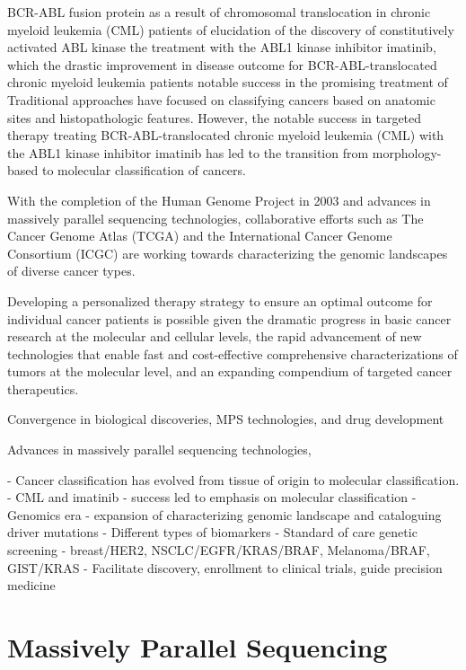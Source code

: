 BCR-ABL fusion protein as a result of chromosomal translocation in chronic myeloid leukemia (CML) patients
of elucidation of the discovery of constitutively activated ABL kinase  the treatment with the ABL1 kinase inhibitor imatinib, which the drastic improvement in disease outcome for BCR-ABL-translocated chronic myeloid leukemia patients notable success in the promising treatment of Traditional approaches have focused on classifying cancers based on anatomic sites and histopathologic features. However, the notable success in targeted therapy treating BCR-ABL-translocated chronic myeloid leukemia (CML) with the ABL1 kinase inhibitor imatinib has led to the transition from morphology-based to molecular classification of cancers.

With the completion of the Human Genome Project in 2003 and advances in massively parallel sequencing technologies, collaborative efforts such as The Cancer Genome Atlas (TCGA) and the International Cancer Genome Consortium (ICGC) are working towards characterizing the genomic landscapes of diverse cancer types.

Developing a personalized therapy strategy to ensure an optimal outcome for individual cancer patients is possible given the dramatic progress in basic cancer research at the molecular and cellular levels, the rapid advancement of new technologies that enable fast and cost-effective comprehensive characterizations of tumors at the molecular level, and an expanding compendium of targeted cancer therapeutics.

Convergence in biological discoveries, MPS technologies, and drug development

Advances in massively parallel sequencing technologies,

- Cancer classification has evolved from tissue of origin to molecular classification.
- CML and imatinib - success led to emphasis on molecular classification
- Genomics era - expansion of characterizing genomic landscape and cataloguing driver mutations
- Different types of biomarkers
- Standard of care genetic screening - breast/HER2, NSCLC/EGFR/KRAS/BRAF, Melanoma/BRAF, GIST/KRAS
- Facilitate discovery, enrollment to clinical trials, guide precision medicine

\section{Massively Parallel Sequencing}
\label{sec:MassivelyParallelSequencing}


